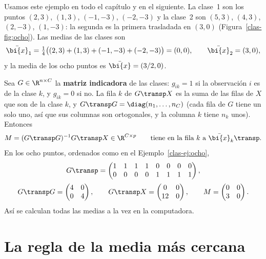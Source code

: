 \begin{example}\label{clas-ej:ocho}
Usamos este ejemplo en todo el capítulo y en el siguiente. La clase~1 son los
puntos $(2,3)$, $(1,3)$, $(-1,-3)$, $(-2,-3)$ y la clase~2 son $(5,3)$,
$(4,3)$, $(2,-3)$, $(1,-3)$: la segunda es la primera trasladada en $(3,0)$
(Figura~\ref{clas-fig:ocho}). Las medias de las clases son
\[
\bar{\bi{x}}_1=\tfrac14\bigl((2,3)+(1,3)+(-1,-3)+(-2,-3)\bigr)=(0,0),\qquad
\bar{\bi{x}}_2=(3,0),
\]
y la media de los ocho puntos es $\bar{\bi{x}}=(3/2,0)$.
\end{example}

\begin{remark}\label{clas-rem:G}
Sea $G\in\R^{n\times C}$ la \textbf{matriz indicadora} de las clases:
$g_{ik}=1$ si la observación $i$ es de la clase $k$, y $g_{ik}=0$ si no. La
fila $k$ de $G\transp X$ es la suma de las filas de $X$ que son de la clase
$k$, y $G\transp G=\diag(n_1,\dots,n_C)$ (cada fila de $G$ tiene un solo uno,
así que sus columnas son ortogonales, y la columna $k$ tiene $n_k$ unos).
Entonces
\[
M=(G\transp G)^{-1}G\transp X\in\R^{C\times p}
\qquad\text{tiene en la fila $k$ a }\bar{\bi{x}}_k\transp .
\]
En los ocho puntos, ordenados como en el Ejemplo~\ref{clas-ej:ocho},
\begin{gather*}
G\transp=\begin{pmatrix}1&1&1&1&0&0&0&0\\0&0&0&0&1&1&1&1\end{pmatrix},\\[2pt]
G\transp G=\begin{pmatrix}4&0\\0&4\end{pmatrix},\qquad
G\transp X=\begin{pmatrix}0&0\\12&0\end{pmatrix},\qquad
M=\begin{pmatrix}0&0\\3&0\end{pmatrix}.
\end{gather*}
Así se calculan todas las medias a la vez en la computadora.
\end{remark}

\section{La regla de la media más cercana}\label{clas-sec:regla}


